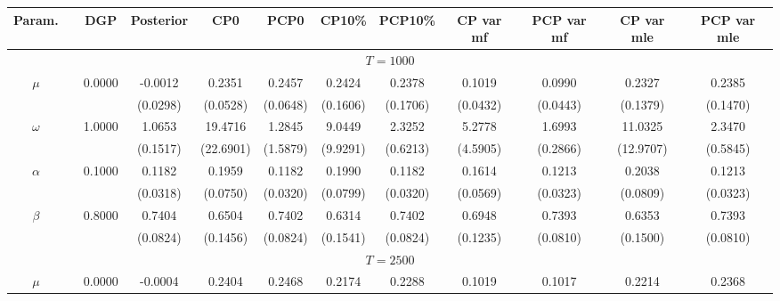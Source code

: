 { \renewcommand{\arraystretch}{1.2} 
\begin{sidewaystable} 
\center 
\begin{tabular}{cc cc| cccc| cccc} 
Param. && DGP & Posterior & CP0  & PCP0 & CP10\%  & PCP10\% &CP var mf & PCP var mf & CP var mle & PCP var mle \\ \hline 
\hline 
\multicolumn{12}{c}{$T =1000$}  \\ 
\hline 
 \rowcolor{LightCyan} 
$\mu$&& 0.0000 & -0.0012 & 0.2351 & 0.2457 & 0.2424 & 0.2378 & 0.1019 & 0.0990 & 0.2327 & 0.2385  \\   
 &&   & (0.0298) & (0.0528) & (0.0648) & (0.1606) & (0.1706) &(0.0432) & (0.0443) & (0.1379) & (0.1470)  \\ 
 \rowcolor{LightCyan} 
$\omega$&& 1.0000 & 1.0653 & 19.4716 & 1.2845 & 9.0449 & 2.3252 & 5.2778 & 1.6993 & 11.0325 & 2.3470  \\   
 &&   & (0.1517) & (22.6901) & (1.5879) & (9.9291) & (0.6213) &(4.5905) & (0.2866) & (12.9707) & (0.5845)  \\ 
 \rowcolor{LightCyan} 
$\alpha$&& 0.1000 & 0.1182 & 0.1959 & 0.1182 & 0.1990 & 0.1182 & 0.1614 & 0.1213 & 0.2038 & 0.1213  \\   
 &&   & (0.0318) & (0.0750) & (0.0320) & (0.0799) & (0.0320) &(0.0569) & (0.0323) & (0.0809) & (0.0323)  \\ 
 \rowcolor{LightCyan} 
$\beta$&& 0.8000 & 0.7404 & 0.6504 & 0.7402 & 0.6314 & 0.7402 & 0.6948 & 0.7393 & 0.6353 & 0.7393  \\   
 &&   & (0.0824) & (0.1456) & (0.0824) & (0.1541) & (0.0824) &(0.1235) & (0.0810) & (0.1500) & (0.0810)  \\ 
\hline 
\multicolumn{12}{c}{$T =2500$}  \\ 
\hline 
 \rowcolor{LightCyan} 
$\mu$&& 0.0000 & -0.0004 & 0.2404 & 0.2468 & 0.2174 & 0.2288 & 0.1019 & 0.1017 & 0.2214 & 0.2368  \\   

\end{tabular}
\end{sidewaystable}}
